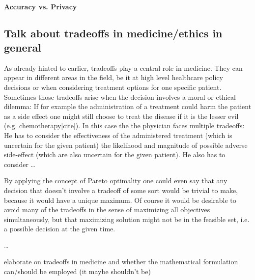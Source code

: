 	\paragraph{Accuracy vs. Privacy}

	\subsection{Talk about tradeoffs in medicine/ethics in general}
	As already hinted to earlier, tradeoffs play a central role in medicine.
	They can appear in different areas in the field, be it at high level healthcare policy decisions or when considering treatment options for one specific patient.
	Sometimes those tradeoffs arise when the decision involves a moral or ethical dilemma:
	If for example the administration of a treatment could harm the patient as a side effect one might still choose to treat the disease if it is the lesser evil (e.g. chemotherapy[cite]).
	In this case the the physician faces multiple tradeoffs:
	He has to consider the effectiveness of the administered treatment (which is uncertain for the given patient) the likelihood and magnitude of possible adverse side-effect (which are also uncertain for the given patient).
	He also has to consider \dots
	
	By applying the concept of Pareto optimality one could even say that any decision that doesn't involve a tradeoff of some sort would be trivial to make, because it would have a unique maximum.
	Of course it would be desirable to avoid many of the tradeoffs in the sense of maximizing all objectives simultaneously, but that maximizing solution might not be in the feasible set, i.e. a possible decision at the given time.

	\dots

	elaborate on tradeoffs in medicine and whether the mathematical formulation can/should be employed (it maybe shouldn't be)
